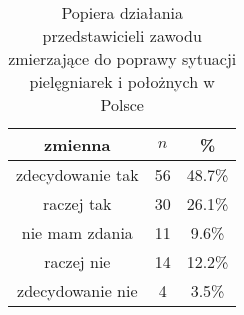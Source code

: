 \begin{table}[H]
\caption{Popiera działania przedstawicieli zawodu zmierzające do poprawy sytuacji pielęgniarek i położnych w Polsce}
\centering
\begin{tabular}{ | c | c | c |}
\hline
zmienna & $n$ & \% \\
\hline
zdecydowanie tak  &  56  & 48.7\% \\
\hline
raczej tak  &  30  & 26.1\% \\
\hline
nie mam zdania  &  11  & 9.6\% \\
\hline
raczej nie  &  14  & 12.2\% \\
\hline
zdecydowanie nie  &  4  & 3.5\% \\
\hline
\end{tabular}
\label{tab:Q19}
\end{table}

